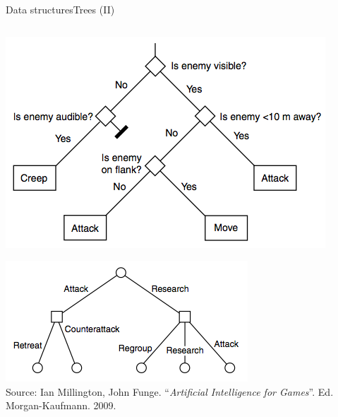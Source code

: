 \documentclass[10pt,compress]{beamer} %
\begin{document}
\begin{frame}{Data structures}{Trees (II)}
    \begin{columns}
	   	\begin{center}
		\vspace{-0.2cm}
		\includegraphics[width=0.9\linewidth]{figs/tree4.png}

		\bigskip

		\vspace{-0.2cm}
		\includegraphics[width=0.9\linewidth]{figs/tree5.png}\\
		\tiny
		Source: Ian Millington, John Funge. ``\textit{Artificial Intelligence for Games}''. Ed. Morgan-Kaufmann. 2009.
		\end{center}


\end{columns}
\end{frame}
\end{document}
